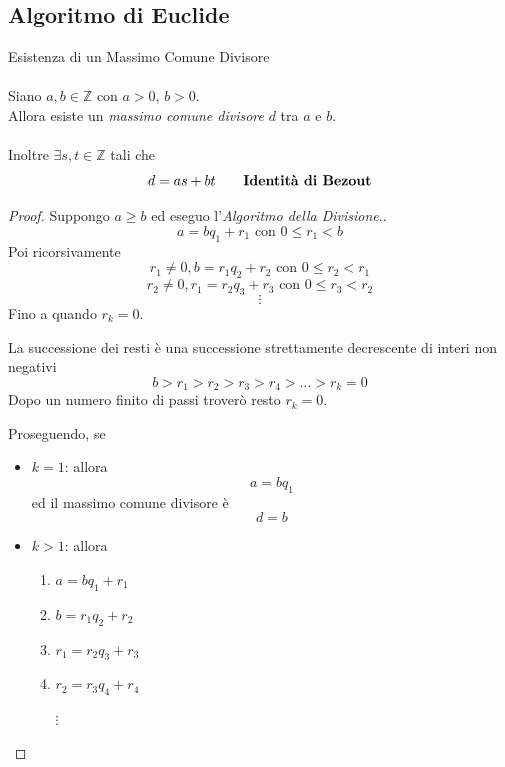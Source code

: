 \documentclass[a4paper,12pt, oneside]{book}
\begin{document}
\subsection{Algoritmo di Euclide}
\begin{teorema}
	Esistenza di un Massimo Comune Divisore\\\\
	Siano $a,b \in \mathbb{Z}$ con $a > 0$, $b > 0$.\\
	Allora esiste un \textit{massimo comune divisore} $d$ tra $a$ e $b$.\\\\
	Inoltre $\exists s, t \in \mathbb{Z}$  tali che
	$$d = as+bt \qquad \mbox{\textbf{Identità di Bezout}}$$
\end{teorema}
\begin{proof}
	Suppongo $a \geq b$ ed eseguo l'\textit{Algoritmo della Divisione}..
	$$a = bq_1+r_1 \mbox{ con } 0 \leq r_1 < b$$
	Poi ricorsivamente
	$$r_1 \not = 0, b = r_1q_2 + r_2 \mbox{ con } 0 \leq r_2 < r_1$$
	$$r_2 \not = 0, r_1 = r_2q_3 + r_3 \mbox{ con } 0 \leq r_3 < r_2$$
	$$\vdots$$
	Fino a quando $r_k = 0$.\\
	\begin{nota}
		La successione dei resti è una successione strettamente decrescente di interi non negativi
		$$b > r_1 > r_2 > r_3 > r_4 > \dots > r_k = 0$$
		Dopo un numero finito di passi troverò resto $r_k = 0$.
	\end{nota}

	Proseguendo, se
	\begin{itemize}
		\item $k = 1$: allora
		      $$a= bq_1$$ ed il massimo comune divisore è $$d = b$$
		\item $k > 1$: allora
		      \begin{enumerate}[label=(\arabic*)]
			      \item $a = bq_1 + r_1$
			      \item $b = r_1q_2 + r_2$
			      \item $r_1 = r_2q_3 + r_3$
			      \item $r_2 = r_3q_4 + r_4$

			            $\vdots$


\end{enumerate}
\end{itemize}
\end{proof}
\end{document}
